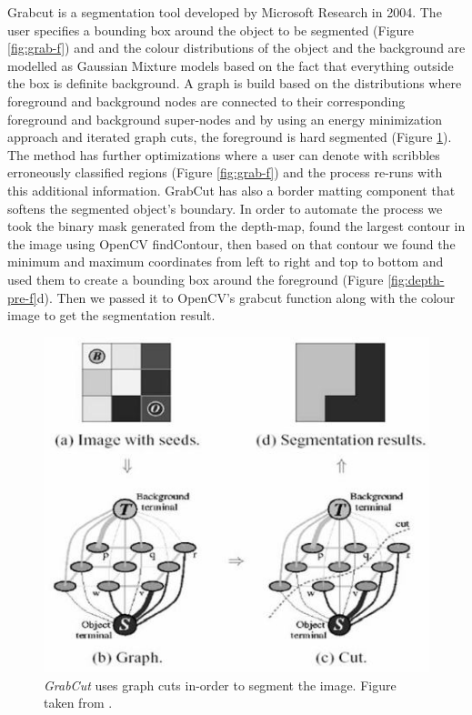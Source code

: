 \par
Grabcut is a segmentation tool developed by Microsoft Research in 2004. The user specifies a bounding box around the object to be segmented (Figure \ref{fig:grab-f}) and and the colour distributions of the object and the background are modelled as Gaussian Mixture models based on the fact that everything outside the box is definite background. A graph is build based on the distributions where foreground and background nodes are connected to their corresponding foreground and background super-nodes and by using an energy minimization approach and iterated graph cuts, the foreground is hard segmented (Figure \ref{fig:graph-f}). The method has further optimizations where a user can denote with scribbles erroneously classified regions (Figure \ref{fig:grab-f}) and the process re-runs with this additional information. GrabCut has also a border matting component that softens the segmented object's boundary. In order to automate the process we took the binary mask generated from the depth-map, found the largest contour in the image using OpenCV findContour, then based on that contour we found the minimum and maximum coordinates from left to right and top to bottom and used them to create a bounding box around the foreground (Figure \ref{fig:depth-pre-f}d). Then we passed it to OpenCV's grabcut function along with the colour image to get the segmentation result.

\begin{figure}[t]
\centering
\includegraphics[width=0.6\columnwidth]{Chapter4/4/graphcut.jpg}
\caption[Graph cuts segmentation.]{\textit{GrabCut} uses graph cuts in-order to segment the image. Figure taken from \cite{grabcut}.}
\label{fig:graph-f}
\end{figure}

